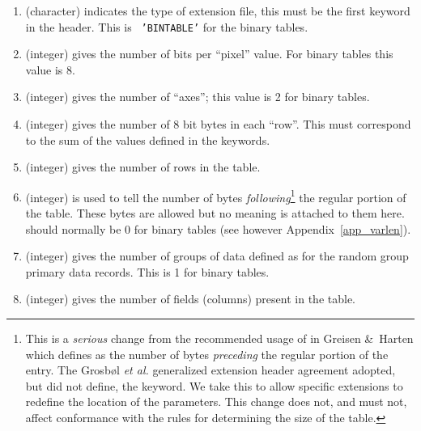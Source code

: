 \begin{enumerate} %
\item {} (character) indicates the type of extension file,
this must be the first keyword in the header.  This is {\tt
'BINTABLE'} for the binary tables.
\item {} (integer) gives the number of bits per ``pixel'' value.
For binary tables this value is 8.
\item {} (integer) gives the number of ``axes''; this value is 2
for binary tables.
\item {} (integer) gives the number of 8 bit bytes in each
``row''. This must correspond to the sum of the values defined in
the  keywords.
\item {} (integer) gives the number of rows in the table.

\item {} (integer) is used to tell the number of bytes {\it
following\/}\footnote{This is a {\it serious} change from the
recommended usage of  in Greisen \&\ Harten \cite{paper2}
which defines  as the number of bytes {\it preceding} the
regular portion of the entry.  The Grosb\o l {\it et al.} \cite{paper3}
generalized extension header agreement adopted, but did not define,
the  keyword.  We take this to allow specific extensions
to redefine the location of the  parameters.  This change
does not, and must not, affect conformance with the rules for
determining the size of the table.} the regular portion of the table.
These bytes are allowed but no meaning is attached to them
here.  should normally be 0 for binary tables (see however
Appendix~\ref{app_varlen}).

\item {} (integer) gives the number of groups of data
defined as for the random group primary data records. This is 1 for
binary tables. 
\item {} (integer) gives the number of fields (columns)
present in the table. 


\end{enumerate}
